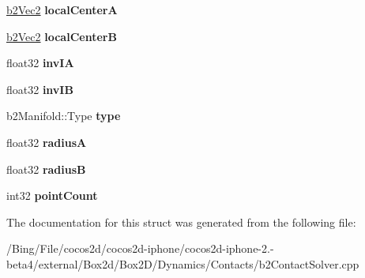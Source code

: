 \begin{DoxyCompactItemize}
\item 
\hypertarget{structb2_contact_position_constraint_a3c0ff098c54e3c3bfed4470c4f62c4ee}{\hyperlink{structb2_vec2}{b2\-Vec2} {\bfseries local\-Center\-A}}\label{structb2_contact_position_constraint_a3c0ff098c54e3c3bfed4470c4f62c4ee}

\item 
\hypertarget{structb2_contact_position_constraint_acf14c9cfcf37ae1c89d0e4bc6c2d3ac2}{\hyperlink{structb2_vec2}{b2\-Vec2} {\bfseries local\-Center\-B}}\label{structb2_contact_position_constraint_acf14c9cfcf37ae1c89d0e4bc6c2d3ac2}

\item 
\hypertarget{structb2_contact_position_constraint_aaf92ebfd9ee6f7734199e7cf65441fdb}{float32 {\bfseries inv\-I\-A}}\label{structb2_contact_position_constraint_aaf92ebfd9ee6f7734199e7cf65441fdb}

\item 
\hypertarget{structb2_contact_position_constraint_a942566765748c8daf934a051457f4b0f}{float32 {\bfseries inv\-I\-B}}\label{structb2_contact_position_constraint_a942566765748c8daf934a051457f4b0f}

\item 
\hypertarget{structb2_contact_position_constraint_a09f96db1c3fe5ede24395e2431e95103}{b2\-Manifold\-::\-Type {\bfseries type}}\label{structb2_contact_position_constraint_a09f96db1c3fe5ede24395e2431e95103}

\item 
\hypertarget{structb2_contact_position_constraint_ae75232327a6d37b0c36c2a8e12ef08b2}{float32 {\bfseries radius\-A}}\label{structb2_contact_position_constraint_ae75232327a6d37b0c36c2a8e12ef08b2}

\item 
\hypertarget{structb2_contact_position_constraint_a066db66f0b944b92c2666271e88e4540}{float32 {\bfseries radius\-B}}\label{structb2_contact_position_constraint_a066db66f0b944b92c2666271e88e4540}

\item 
\hypertarget{structb2_contact_position_constraint_a98c9f0e1e7041ed2b15370ed713b84fc}{int32 {\bfseries point\-Count}}\label{structb2_contact_position_constraint_a98c9f0e1e7041ed2b15370ed713b84fc}

\end{DoxyCompactItemize}


The documentation for this struct was generated from the following file\-:\begin{DoxyCompactItemize}
\item 
/\-Bing/\-File/cocos2d/cocos2d-\/iphone/cocos2d-\/iphone-\/2.-\/beta4/external/\-Box2d/\-Box2\-D/\-Dynamics/\-Contacts/b2\-Contact\-Solver.\-cpp\end{DoxyCompactItemize}
